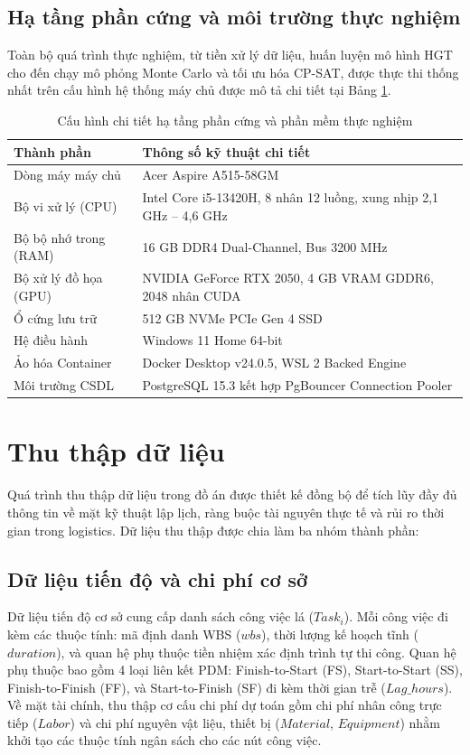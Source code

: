 \subsection{Hạ tầng phần cứng và môi trường thực nghiệm}
Toàn bộ quá trình thực nghiệm, từ tiền xử lý dữ liệu, huấn luyện mô hình HGT cho đến chạy mô phỏng Monte Carlo và tối ưu hóa CP-SAT, được thực thi thống nhất trên cấu hình hệ thống máy chủ được mô tả chi tiết tại Bảng \ref{tab:hardware_configuration}.

\begin{table}[H]
\centering
\caption{Cấu hình chi tiết hạ tầng phần cứng và phần mềm thực nghiệm}
\label{tab:hardware_configuration}
\small
\begin{tabular}{ll}
\toprule
\textbf{Thành phần} & \textbf{Thông số kỹ thuật chi tiết} \\
\midrule
Dòng máy máy chủ & Acer Aspire A515-58GM \\
Bộ vi xử lý (CPU) & Intel Core i5-13420H, 8 nhân 12 luồng, xung nhịp 2,1 GHz -- 4,6 GHz \\
Bộ bộ nhớ trong (RAM) & 16 GB DDR4 Dual-Channel, Bus 3200 MHz \\
Bộ xử lý đồ họa (GPU) & NVIDIA GeForce RTX 2050, 4 GB VRAM GDDR6, 2048 nhân CUDA \\
Ổ cứng lưu trữ & 512 GB NVMe PCIe Gen 4 SSD \\
Hệ điều hành & Windows 11 Home 64-bit \\
Ảo hóa Container & Docker Desktop v24.0.5, WSL 2 Backed Engine \\
Môi trường CSDL & PostgreSQL 15.3 kết hợp PgBouncer Connection Pooler \\
\bottomrule
\end{tabular}
\end{table}

\section{Thu thập dữ liệu}
\label{sec:2.3_data_collection}

Quá trình thu thập dữ liệu trong đồ án được thiết kế đồng bộ để tích lũy đầy đủ thông tin về mặt kỹ thuật lập lịch, ràng buộc tài nguyên thực tế và rủi ro thời gian trong logistics. Dữ liệu thu thập được chia làm ba nhóm thành phần:

\subsection{Dữ liệu tiến độ và chi phí cơ sở}
Dữ liệu tiến độ cơ sở cung cấp danh sách công việc lá ($Task_i$). Mỗi công việc đi kèm các thuộc tính: mã định danh WBS ($wbs$), thời lượng kế hoạch tĩnh ($duration$), và quan hệ phụ thuộc tiền nhiệm xác định trình tự thi công. Quan hệ phụ thuộc bao gồm 4 loại liên kết PDM: Finish-to-Start (FS), Start-to-Start (SS), Finish-to-Finish (FF), và Start-to-Finish (SF) đi kèm thời gian trễ ($Lag\_hours$). 
Về mặt tài chính, thu thập cơ cấu chi phí dự toán gồm chi phí nhân công trực tiếp ($Labor$) và chi phí nguyên vật liệu, thiết bị ($Material$, $Equipment$) nhằm khởi tạo các thuộc tính ngân sách cho các nút công việc.


